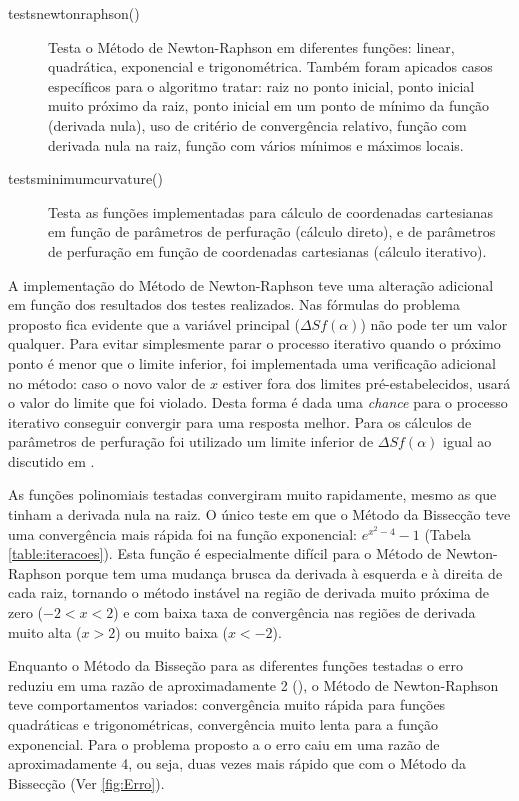 \documentclass[final,3p,12pt]{elsarticle}
\begin{document}
    \begin{description}
        \item[tests\textunderscore newton\textunderscore raphson()] Testa o Método de Newton-Raphson em diferentes funções: linear, quadrática, exponencial e trigonométrica. Também foram apicados casos específicos para o algoritmo tratar: raiz no ponto inicial, ponto inicial muito próximo da raiz, ponto inicial em um ponto de mínimo da função (derivada nula), uso de critério de convergência relativo, função com derivada nula na raiz, função com vários mínimos e máximos locais.
        
        \item[tests\textunderscore minimum\textunderscore curvature()] Testa as funções implementadas para cálculo de coordenadas cartesianas em função de parâmetros de perfuração (cálculo direto), e de parâmetros de perfuração em função de coordenadas cartesianas (cálculo iterativo).
    \end{description}

    A implementação do Método de Newton-Raphson teve uma alteração adicional em função dos resultados dos testes realizados. Nas fórmulas do problema proposto fica evidente que a variável principal ($\Delta S f(\alpha)$) não pode ter um valor qualquer. Para evitar simplesmente parar o processo iterativo quando o próximo ponto é menor que o limite inferior, foi implementada uma verificação adicional no método: caso o novo valor de $x$ estiver fora dos limites pré-estabelecidos, usará o valor do limite que foi violado. Desta forma é dada uma \emph{chance} para o processo iterativo conseguir convergir para uma resposta melhor. Para os cálculos de parâmetros de perfuração foi utilizado um limite inferior de $\Delta S f(\alpha)$ igual ao discutido em \cite{relatoriobisseccao}.

    As funções polinomiais testadas convergiram muito rapidamente, mesmo as que tinham a derivada nula na raiz. O único teste em que o Método da Bissecção teve uma convergência mais rápida foi na função exponencial: $e^{x^2-4}-1$ (Tabela \ref{table:iteracoes}). Esta função é especialmente difícil para o Método de Newton-Raphson porque tem uma mudança brusca da derivada à esquerda e à direita de cada raiz, tornando o método instável na região de derivada muito próxima de zero ($-2<x<2$) e com baixa taxa de convergência nas regiões de derivada muito alta ($x>2$) ou muito baixa ($x<-2$). 
    
    Enquanto o Método da Bisseção para as diferentes funções testadas o erro reduziu em uma razão de aproximadamente 2 (\cite{relatoriobisseccao}), o Método de Newton-Raphson teve comportamentos variados: convergência muito rápida para funções quadráticas e trigonométricas, convergência muito lenta para a função exponencial. Para o problema proposto a o erro caiu em uma razão de aproximadamente 4, ou seja, duas vezes mais rápido que com o Método da Bissecção (Ver \ref{fig:Erro}). 
\end{document}
